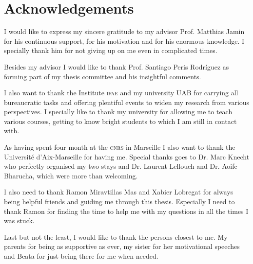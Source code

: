 \documentclass[../../index.tex]{subfiles}
\begin{document}
\chapter*{Acknowledgements}
I would like to express my sincere gratitude to my advisor Prof. Matthias Jamin
for his continuous support, for his motivation and for his enormous knowledge. I
specially thank him for not giving up on me even in complicated times.

Besides my advisor I would like to thank Prof. Santiago Peris Rodríguez as
forming part of my thesis committee and his insightful comments.

I also want to thank the Institute \textsc{ifae} and my university \textsc{UAB}
for carrying all bureaucratic tasks and offering plentiful events to widen my
research from various perspectives. I specially like to thank my university for
allowing me to teach various courses, getting to know bright students to which I
am still in contact with.

As having spent four month at the \textsc{cnrs} in Marseille I also want to
thank the Université d'Aix-Marseille for having me. Special thanks goes to Dr.
Marc Knecht who perfectly organised my two stays and Dr. Laurent Lellouch and
Dr. Aoife Bharucha, which were more than welcoming.

I also need to thank Ramon Miravtillas Mas and Xabier Lobregat for always being
helpful friends and guiding me through this thesis. Especially I need to thank
Ramon for finding the time to help me with my questions in all the times I was
stuck.

Last but not the least, I would like to thank the persons closest to me. My
parents for being as supportive as ever, my sister for her motivational speeches
and Beata for just being there for me when needed.
\end{document}
